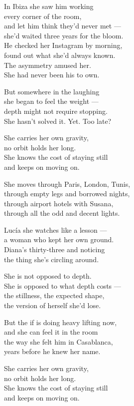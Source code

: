 \begin{lyrics}
In Ibiza she saw him working\\
every corner of the room,\\
and let him think they'd never met —\\
she'd waited three years for the bloom.\\
He checked her Instagram by morning,\\
found out what she'd always known.\\
The asymmetry amused her.\\
She had never been his to own.

But somewhere in the laughing\\
she began to feel the weight —\\
depth might not require stopping.\\
She hasn't solved it. Yet. Too late?


She carries her own gravity,\\
no orbit holds her long.\\
She knows the cost of staying still\\
and keeps on moving on.

She moves through Paris, London, Tunis,\\
through empty legs and borrowed nights,\\
through airport hotels with Susana,\\
through all the odd and decent lights.

Lucía she watches like a lesson —\\
a woman who kept her own ground.\\
Diana's thirty-three and noticing\\
the thing she's circling around.

She is not opposed to depth.\\
She is opposed to what depth costs —\\
the stillness, the expected shape,\\
the version of herself she'd lose.

But the if is doing heavy lifting now,\\
and she can feel it in the room\\
the way she felt him in Casablanca,\\
years before he knew her name.


She carries her own gravity,\\
no orbit holds her long.\\
She knows the cost of staying still\\
and keeps on moving on.

\end{lyrics}

